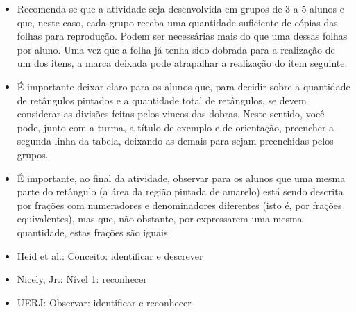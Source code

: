 \begin{multicols}{2}
\begin{itemize} %
    \item       Recomenda-se que a atividade seja desenvolvida em grupos de 3 a
5 alunos e que, neste caso, cada grupo receba uma quantidade suficiente de
cópias das             folhas para reprodução. Podem ser necessárias mais
do que uma dessas folhas por aluno. Uma vez que a folha já tenha sido dobrada
para a realização de um dos itens, a marca deixada pode atrapalhar a realização
do item seguinte.
    \item       É importante deixar claro para os alunos que, para decidir sobre
a quantidade de retângulos pintados e a quantidade total de retângulos, se devem
considerar as divisões feitas pelos vincos das dobras. Neste sentido, você pode,
junto com a turma, a título de exemplo e de orientação, preencher a segunda
linha da tabela, deixando as demais para sejam preenchidas pelos grupos.
    \item       É importante, ao final da atividade, observar para os alunos que
uma mesma parte do retângulo (a área da região pintada de amarelo) está sendo
descrita por frações com numeradores e denominadores diferentes (isto é, por
frações equivalentes), mas que, não obstante, por expressarem uma mesma
quantidade, estas frações são iguais.
\end{itemize} %


   \vspace{.1cm}

 \vspace{.1cm}

\begin{itemize} %
    \item       Heid et al.: Conceito: identificar e descrever
    \item       Nicely, Jr.: Nível 1: reconhecer
    \item       UERJ: Observar: identificar e reconhecer
\end{itemize} %

  \end{multicols}
  \pagebreak

